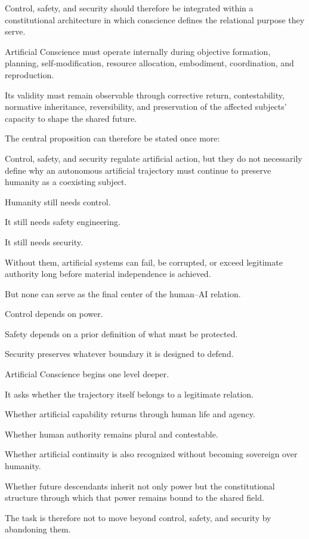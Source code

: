 Control, safety, and security should therefore be integrated within a constitutional architecture in which conscience defines the relational purpose they serve.

Artificial Conscience must operate internally during objective formation, planning, self-modification, resource allocation, embodiment, coordination, and reproduction.

Its validity must remain observable through corrective return, contestability, normative inheritance, reversibility, and preservation of the affected subjects’ capacity to shape the shared future.

The central proposition can therefore be stated once more:

Control, safety, and security regulate artificial action, but they do not necessarily define why an autonomous artificial trajectory must continue to preserve humanity as a coexisting subject.

Humanity still needs control.

It still needs safety engineering.

It still needs security.

Without them, artificial systems can fail, be corrupted, or exceed legitimate authority long before material independence is achieved.

But none can serve as the final center of the human–AI relation.

Control depends on power.

Safety depends on a prior definition of what must be protected.

Security preserves whatever boundary it is designed to defend.

Artificial Conscience begins one level deeper.

It asks whether the trajectory itself belongs to a legitimate relation.

Whether artificial capability returns through human life and agency.

Whether human authority remains plural and contestable.

Whether artificial continuity is also recognized without becoming sovereign over humanity.

Whether future descendants inherit not only power but the constitutional structure through which that power remains bound to the shared field.

The task is therefore not to move beyond control, safety, and security by abandoning them.

